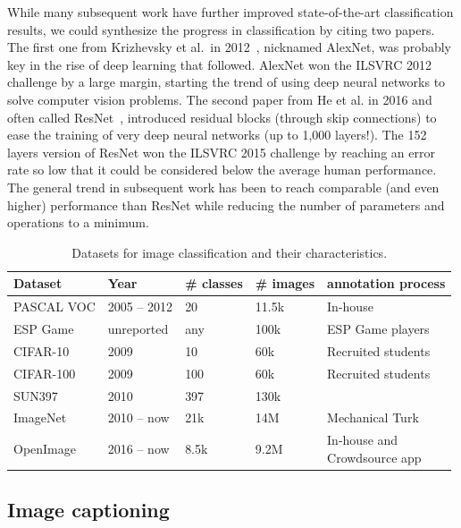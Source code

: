 While many subsequent work have further improved state-of-the-art classification results,
we could synthesize the progress in classification by citing two papers.
The first one from Krizhevsky et al.\ in 2012~\cite{krizhevsky2012imagenet},
nicknamed AlexNet, was probably key in the rise of deep learning that followed.
AlexNet won the ILSVRC 2012 challenge by a large margin,
starting the trend of using deep neural networks to solve computer vision problems.
The second paper from He et al. in 2016 and often called ResNet~\cite{he2016deep},
introduced residual blocks (through skip connections)
to ease the training of very deep neural networks (up to 1,000 layers!).
The 152 layers version of ResNet won the ILSVRC 2015 challenge
by reaching an error rate so low that
it could be considered below the average human performance.
The general trend in subsequent work has been to reach comparable
(and even higher) performance than ResNet while
reducing the number of parameters and operations to a minimum.

\begin{table}
\centering
\caption{Datasets for image classification and their characteristics.}
\begin{tabular}{lllll}
	Dataset & Year & \# classes & \# images &  annotation process \\
	\midrule
	PASCAL VOC \cite{Everingham10} & 2005 -- 2012 & 20 & 11.5k &  In-house \\
	ESP Game \cite{von2005esp} & unreported & any & 100k &  ESP Game players \\
	CIFAR-10 \cite{krizhevsky2009learning} & 2009 & 10 & 60k  & Recruited students \\
	CIFAR-100 \cite{krizhevsky2009learning} & 2009 & 100 & 60k  & Recruited students \\
	SUN397 \cite{xiao2010sun} & 2010 & 397 & 130k &   \\
	ImageNet \cite{ILSVRC15} & 2010 -- now & 21k & 14M &  Mechanical Turk \\
	OpenImage \cite{OpenImages, OpenImages2} & 2016 -- now & 8.5k & 9.2M & \makecell[l]{In-house and\\Crowdsource app} \\
\end{tabular}%
\label{tab:classification_ds}
\end{table}

\subsection{Image captioning}

